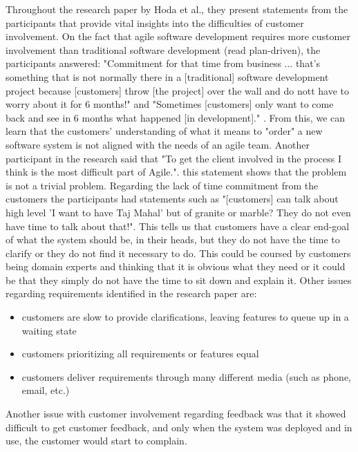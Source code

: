 Throughout the research paper by Hoda et al., they present statements from the participants that provide vital insights into the difficulties of customer involvement. On the fact that agile software development requires more customer involvement than traditional software development (read plan-driven), the participants answered: "Commitment for that time from business ... that's something that is not normally there in a [traditional] software development project because [customers] throw [the project] over the wall and do nott have to worry about it for 6 months!" and "Sometimes [customers] only want to come back and see in 6 months what happened [in development]." \cite{Hoda2011TheIO}. From this, we can learn that the customers' understanding of what it means to "order" a new software system is not aligned with the needs of an agile team. Another participant in the research said that "To get the client involved in the process I think is the most difficult part of Agile.\cite{Hoda2011TheIO}". this statement shows that the problem is not a trivial problem. Regarding the lack of time commitment from the customers the participants had statements such as "[customers] can talk about high level 'I want to have Taj Mahal' but of granite or marble? They do not even have time to talk about that!\cite{Hoda2011TheIO}". This tells us that customers have a clear end-goal of what the system should be, in their heads, but they do not have the time to clarify or they do not find it necessary to do. This could be coursed by customers being domain experts and thinking that it is obvious what they need or it could be that they simply do not have the time to sit down and explain it. Other issues regarding requirements identified in the research paper are:
\begin{itemize}
 \item customers are slow to provide clarifications, leaving features to queue up in a waiting state
 \item customers prioritizing all requirements or features equal
 \item customers deliver requirements through many different media (such as phone, email, etc.)
\end{itemize}

Another issue with customer involvement regarding feedback was that it showed difficult to get customer feedback, and only when the system was deployed and in use, the customer would start to complain.

